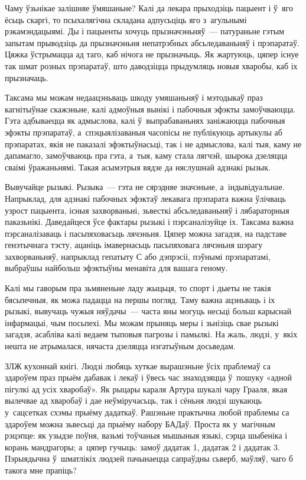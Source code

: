Чаму ўзьнікае залішняе ўмяшаньне? Калі да лекара прыходзіць пацыент і ў~яго ёсьць скаргі, то псыхалягічна складана адпусьціць яго з~агульнымі рэкамэндацыямі. Ды і пацыенты хочуць прызначэньняў~--- патураньне гэтым запытам прыводзіць да прызначэньня непатрэбных абсьледаваньняў і прэпаратаў. Цяжка ўстрымацца ад таго, каб нічога не прызначыць. Як жартуюць, цяпер існуе так шмат розных прэпаратаў, што даводзіцца прыдумляць новыя хваробы, каб іх прызначаць.

Таксама мы можам недаацэньваць шкоду умяшаньняў і мэтодыкаў праз кагнітыўнае скажэньне, калі адмоўныя вынікі і пабочныя эфэкты замоўчваюцца. Гэта адбываецца як адмыслова, калі ў~выпрабаваньнях заніжаюцца пабочныя эфэкты прэпаратаў, а~спэцыялізаваныя часопісы не публікуюць артыкулы аб прэпаратах, якія не паказалі эфэктыўнасьці, так і не адмыслова, калі тыя, каму не дапамагло, замоўчваюць пра гэта, а~тыя, каму стала лягчэй, шырока дзеляцца сваімі ўражаньнямі. Такая асымэтрыя вядзе да няслушнай адзнакі рызык.

Вывучайце рызыкі. Рызыка~--- гэта не сярэдняе значэньне, а~індывідуальнае. Напрыклад, для адзнакі пабочных эфэктаў лекавага прэпарата важна ўлічваць узрост пацыента, існыя захворваньні, зьвесткі абсьледаваньняў і лябараторныя паказьнікі. Даведайцеся ўсе фактары рызыкі і пэрсаналізуйце іх. Таксама важна пэрсаналізаваць і пасьпяховасьць лячэньня. Цяпер можна загадзя, на падставе генэтычнага тэсту, ацаніць імавернасьць пасьпяховага лячэньня шэрагу захворваньняў, напрыклад гепатыту С або дэпрэсіі, пэўнымі прэпаратамі, выбраўшы найбольш эфэктыўны менавіта для вашага геному.

Калі мы гаворым пра зьмяненьне ладу жыцьця, то спорт і дыеты не такія бясьпечныя, як можа падацца на першы погляд. Таму важна ацэньваць і іх рызыкі, вывучаць чужыя няўдачы~--- часта яны могуць несьці больш карыснай інфармацыі, чым посьпехі. Мы можам прыняць меры і зьнізіць свае рызыкі загадзя, асабліва калі ведаем тыповыя пагрозы і памылкі. На жаль, людзі, у~якіх нешта не атрымалася, нячаста дзеляцца нэгатыўным досьведам.

ЗЛЖ кухоннай кнігі. Людзі любяць хуткае вырашэньне ўсіх праблемаў са здароўем праз прыём дабавак і лекаў і ўвесь час знаходзяцца ў~пошуку «адной пігулкі ад усіх хваробаў». Як рыцары караля Артура шукалі чару Грааля, якая вылечвае ад хваробаў і дае неўміручасьць, так і сёньня людзі шукаюць у~сацсетках схэмы прыёму дадаткаў. Рашэньне практычна любой праблемы са здароўем можна зьвесьці да прыёму набору БАДаў. Проста як у~магічным рэцэпце: як узыдзе поўня, вазьмі тоўчаныя мышыныя языкі, сэрца шыбеніка і корань мандрагоры; а~цяпер гучыць: замоў дадатак 1, дадатак 2 і дадатак 3. Пэрыядычна ў~шматлікіх людзей пачынаецца сапраўдны сьверб, маўляў, чаго б такога мне прапіць?

